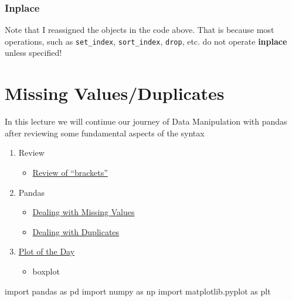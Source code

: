 \documentclass[
  letterpaper,
  DIV=11,
  numbers=noendperiod]{scrreprt}
\newenvironment{Shaded}{\begin{snugshade}}{\end{snugshade}}
\newcommand{\ImportTok}[1]{\textcolor[rgb]{0.00,0.46,0.62}{#1}}
\newcommand{\NormalTok}[1]{\textcolor[rgb]{0.00,0.23,0.31}{#1}}
\providecommand{\tightlist}{%
  \setlength{\itemsep}{0pt}\setlength{\parskip}{0pt}}\usepackage{longtable,booktabs,array}
\begin{document}
\hypertarget{inplace}{%
\subsection{Inplace}\label{inplace}}

Note that I reassigned the objects in the code above. That is because
most operations, such as \texttt{set\_index}, \texttt{sort\_index},
\texttt{drop}, etc. do not operate \textbf{inplace} unless specified!


\hypertarget{missing-valuesduplicates}{%
\chapter{Missing Values/Duplicates}\label{missing-valuesduplicates}}

In this lecture we will continue our journey of Data Manipulation with
pandas after reviewing some fundamental aspects of the syntax

\begin{enumerate}
\def\labelenumi{\arabic{enumi}.}
\tightlist
\item
  Review

  \begin{itemize}
  \tightlist
  \item
    \protect\hyperlink{Review-of-ux5cux2522bracketsux5cux2522}{Review of
    ``brackets''}
  \end{itemize}
\item
  Pandas

  \begin{itemize}
  \tightlist
  \item
    \protect\hyperlink{Missing-Values}{Dealing with Missing Values}
  \item
    \protect\hyperlink{Duplicate-Values}{Dealing with Duplicates}
  \end{itemize}
\item
  \protect\hyperlink{Plotting}{Plot of the Day}

  \begin{itemize}
  \tightlist
  \item
    boxplot
  \end{itemize}
\end{enumerate}

\begin{Shaded}
\begin{Highlighting}[]
\ImportTok{import}\NormalTok{ pandas }\ImportTok{as}\NormalTok{ pd}
\ImportTok{import}\NormalTok{ numpy }\ImportTok{as}\NormalTok{ np}
\ImportTok{import}\NormalTok{ matplotlib.pyplot }\ImportTok{as}\NormalTok{ plt}
\end{Highlighting}
\end{Shaded}
\end{document}
